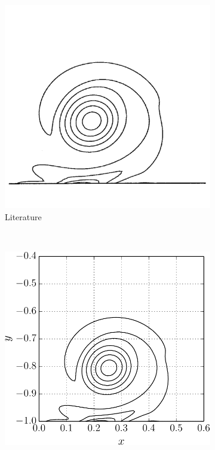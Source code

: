 	\begin{figure}[!t]
     \centering
     \begin{subfigure}[t]{0.4\textwidth}
             \includegraphics[width=\textwidth]{figures/eulerian/VorticityContourPlot-rotated270.pdf}
             \caption{Literature}
             \label{fig:VorticityContourPlot}
     \end{subfigure}%
     ~ %
     \begin{subfigure}[t]{0.45\textwidth}
             \includegraphics[width=\textwidth]{figures/eulerian/dipole_contourLine_t1p0_corrected-crop.pdf}

\end{subfigure}
\end{figure}

